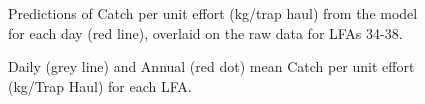 \documentclass[11pt]{article}
\newcommand{\e}{\string~/bio.data/bio.lobster/figures/} %
\newcommand{\ebh}{\string~/bio.data/bio.lobster/figures/LFA3438Framework2019/} %
\begin{document}
%
%                     
%                    
%                     
%                    
%




    \begin{figure}
    \centering
        \caption{Predictions of Catch per unit effort (kg/trap haul) from the model for each day (red line), overlaid on the raw data for LFAs 34-38. }

    \end{figure}

%
%

    \begin{figure}
    \centering
        \caption{Daily (grey line) and Annual (red dot) mean Catch per unit effort (kg/Trap Haul) for each LFA.}

    \end{figure}
\end{document}
